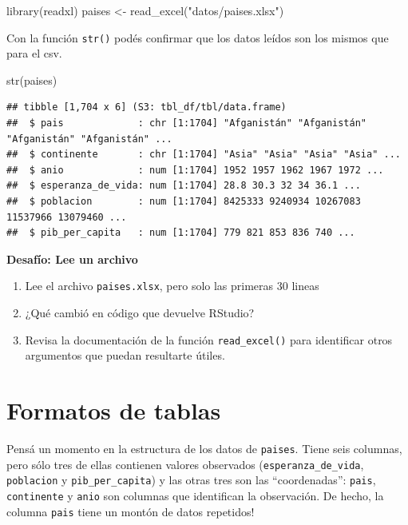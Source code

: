 \documentclass[
  openany]{book}
\newenvironment{Shaded}{\begin{snugshade}}{\end{snugshade}}
\newcommand{\FunctionTok}[1]{\textcolor[rgb]{0.00,0.00,0.00}{#1}}
\newcommand{\NormalTok}[1]{#1}
\newcommand{\OtherTok}[1]{\textcolor[rgb]{0.56,0.35,0.01}{#1}}
\newcommand{\StringTok}[1]{\textcolor[rgb]{0.31,0.60,0.02}{#1}}
\providecommand{\tightlist}{%
  \setlength{\itemsep}{0pt}\setlength{\parskip}{0pt}}
\begin{document}
\begin{Shaded}
\begin{Highlighting}[]
\FunctionTok{library}\NormalTok{(readxl)}
\NormalTok{paises }\OtherTok{\textless{}{-}} \FunctionTok{read\_excel}\NormalTok{(}\StringTok{"datos/paises.xlsx"}\NormalTok{)}
\end{Highlighting}
\end{Shaded}

Con la función \texttt{str()} podés confirmar que los datos leídos son los mismos que para el csv.

\begin{Shaded}
\begin{Highlighting}[]
\FunctionTok{str}\NormalTok{(paises)}
\end{Highlighting}
\end{Shaded}

\begin{verbatim}
## tibble [1,704 x 6] (S3: tbl_df/tbl/data.frame)
##  $ pais             : chr [1:1704] "Afganistán" "Afganistán" "Afganistán" "Afganistán" ...
##  $ continente       : chr [1:1704] "Asia" "Asia" "Asia" "Asia" ...
##  $ anio             : num [1:1704] 1952 1957 1962 1967 1972 ...
##  $ esperanza_de_vida: num [1:1704] 28.8 30.3 32 34 36.1 ...
##  $ poblacion        : num [1:1704] 8425333 9240934 10267083 11537966 13079460 ...
##  $ pib_per_capita   : num [1:1704] 779 821 853 836 740 ...
\end{verbatim}

\textbf{Desafío: Lee un archivo}

\begin{enumerate}
\def\labelenumi{\arabic{enumi}.}
\tightlist
\item
  Lee el archivo \texttt{paises.xlsx}, pero solo las primeras 30 lineas
\item
  ¿Qué cambió en código que devuelve RStudio?
\item
  Revisa la documentación de la función \texttt{read\_excel()} para identificar otros argumentos que puedan resultarte útiles.
\end{enumerate}

\hypertarget{formatos-de-tablas}{%
\section{Formatos de tablas}\label{formatos-de-tablas}}

Pensá un momento en la estructura de los datos de \texttt{paises}.
Tiene seis columnas, pero sólo tres de ellas contienen valores observados (\texttt{esperanza\_de\_vida}, \texttt{poblacion} y \texttt{pib\_per\_capita}) y las otras tres son las ``coordenadas'': \texttt{pais}, \texttt{continente} y \texttt{anio} son columnas que identifican la observación.
De hecho, la columna \texttt{pais} tiene un montón de datos repetidos!
\end{document}
